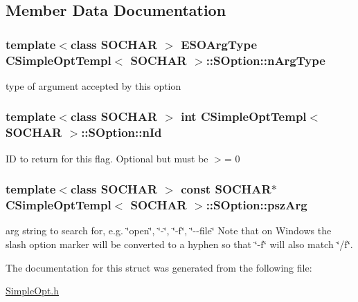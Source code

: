 \subsection{Member Data Documentation}
\hypertarget{struct_c_simple_opt_templ_1_1_s_option_a183ddbb6c06a3578db4dfb26fce16f21}{
\subsubsection[{n\-Arg\-Type}]{\setlength{\rightskip}{0pt plus 5cm}template$<$class S\-O\-C\-H\-A\-R $>$ {\bf E\-S\-O\-Arg\-Type} {\bf C\-Simple\-Opt\-Templ}$<$ S\-O\-C\-H\-A\-R $>$\-::S\-Option\-::n\-Arg\-Type}}\label{struct_c_simple_opt_templ_1_1_s_option_a183ddbb6c06a3578db4dfb26fce16f21}
type of argument accepted by this option \hypertarget{struct_c_simple_opt_templ_1_1_s_option_a10837f04451fe178b47f1c956db23964}{
\subsubsection[{n\-Id}]{\setlength{\rightskip}{0pt plus 5cm}template$<$class S\-O\-C\-H\-A\-R $>$ int {\bf C\-Simple\-Opt\-Templ}$<$ S\-O\-C\-H\-A\-R $>$\-::S\-Option\-::n\-Id}}\label{struct_c_simple_opt_templ_1_1_s_option_a10837f04451fe178b47f1c956db23964}
I\-D to return for this flag. Optional but must be $>$= 0 \hypertarget{struct_c_simple_opt_templ_1_1_s_option_a98c6fe397df4a04140d549373c18622b}{
\subsubsection[{psz\-Arg}]{\setlength{\rightskip}{0pt plus 5cm}template$<$class S\-O\-C\-H\-A\-R $>$ const S\-O\-C\-H\-A\-R$\ast$ {\bf C\-Simple\-Opt\-Templ}$<$ S\-O\-C\-H\-A\-R $>$\-::S\-Option\-::psz\-Arg}}\label{struct_c_simple_opt_templ_1_1_s_option_a98c6fe397df4a04140d549373c18622b}
arg string to search for, e.\-g. \char`\"{}open\char`\"{}, \char`\"{}-\/\char`\"{}, \char`\"{}-\/f\char`\"{}, \char`\"{}-\/-\/file\char`\"{} Note that on Windows the slash option marker will be converted to a hyphen so that \char`\"{}-\/f\char`\"{} will also match \char`\"{}/f\char`\"{}. 

The documentation for this struct was generated from the following file\-:\begin{DoxyCompactItemize}
\item 
\hyperlink{_simple_opt_8h}{Simple\-Opt.\-h}\end{DoxyCompactItemize}
